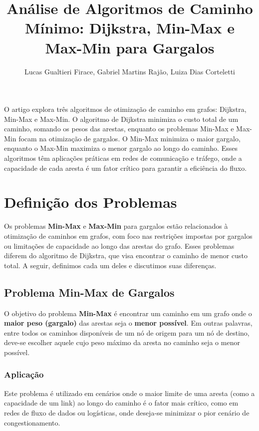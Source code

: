 \documentclass[12pt]{article}
\title{Análise de Algoritmos de Caminho Mínimo: Dijkstra, Min-Max e Max-Min para Gargalos}
\author{Lucas Gualtieri Firace\inst{1}, Gabriel Martins Rajão\inst{1}, Luiza Dias Corteletti\inst{1} }
\begin{document}
 

\maketitle

\begin{resumo} 
  O artigo explora três algoritmos de otimização de caminho em grafos: Dijkstra, Min-Max e Max-Min. O algoritmo de Dijkstra minimiza o custo total de um caminho, somando os pesos das arestas, enquanto os problemas Min-Max e Max-Min focam na otimização de gargalos. O Min-Max minimiza o maior gargalo, enquanto o Max-Min maximiza o menor gargalo ao longo do caminho. Esses algoritmos têm aplicações práticas em redes de comunicação e tráfego, onde a capacidade de cada aresta é um fator crítico para garantir a eficiência do fluxo.
\end{resumo}

\section{Definição dos Problemas}

Os problemas \textbf{Min-Max} e \textbf{Max-Min} para gargalos estão relacionados à otimização de caminhos em grafos, com foco nas restrições impostas por gargalos ou limitações de capacidade ao longo das arestas do grafo. Esses problemas diferem do algoritmo de Dijkstra, que visa encontrar o caminho de menor custo total. A seguir, definimos cada um deles e discutimos suas diferenças.

\subsection{Problema Min-Max de Gargalos}

O objetivo do problema \textbf{Min-Max} é encontrar um caminho em um grafo onde o \textbf{maior peso (gargalo)} das arestas seja o \textbf{menor possível}. Em outras palavras, entre todos os caminhos disponíveis de um nó de origem para um nó de destino, deve-se escolher aquele cujo peso máximo da aresta no caminho seja o menor possível.

\subsubsection{Aplicação}
Este problema é utilizado em cenários onde o maior limite de uma aresta (como a capacidade de um link) ao longo do caminho é o fator mais crítico, como em redes de fluxo de dados ou logísticas, onde deseja-se minimizar o pior cenário de congestionamento.
\end{document}

